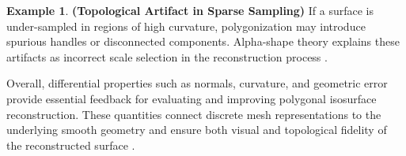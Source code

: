 \documentclass[12pt, a4paper, oneside]{book}
\theoremstyle{plain}
\theoremstyle{definition}
\newtheorem{example}[theorem]{Example}
\theoremstyle{remark}
\theoremstyle{definition}
\begin{document}
\begin{example}
    \textbf{(Topological Artifact in Sparse Sampling)}
If a surface is under-sampled in regions of high curvature, polygonization may introduce
spurious handles or disconnected components. Alpha-shape theory explains these artifacts
as incorrect scale selection in the reconstruction process \cite{edelsbrunner1994three}.
\end{example}

\vspace{0.5em}

Overall, differential properties such as normals, curvature, and geometric error provide
essential feedback for evaluating and improving polygonal isosurface reconstruction.
These quantities connect discrete mesh representations to the underlying smooth geometry
and ensure both visual and topological fidelity of the reconstructed surface
\cite{rusinkiewicz2004estimating,taubin1995curvature,cignoni1998metro,garland1997quadric,edelsbrunner1994three}.


\newpage



\end{document}
